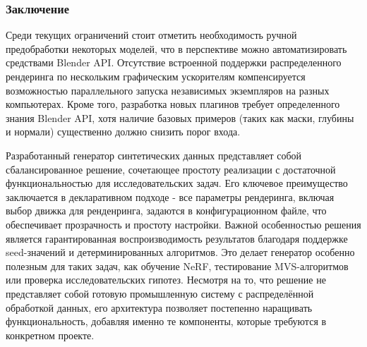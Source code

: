\subsubsection*{Заключение}

Среди текущих ограничений стоит отметить необходимость ручной предобработки
некоторых моделей, что в перспективе можно автоматизировать средствами Blender
API. Отсутствие встроенной поддержки распределенного рендеринга по нескольким
графическим ускорителям компенсируется возможностью параллельного запуска
независимых экземпляров на разных компьютерах. Кроме того, разработка новых
плагинов требует определенного знания Blender API, хотя наличие базовых примеров
(таких как маски, глубины и нормали) существенно должно снизить порог входа.

Разработанный генератор синтетических данных представляет собой сбалансированное
решение, сочетающее простоту реализации с достаточной функциональностью для
исследовательских задач. Его ключевое преимущество заключается в декларативном
подходе - все параметры рендеринга, включая выбор движка для ренденринга,
задаются в конфигурационном файле, что обеспечивает прозрачность и простоту
настройки. Важной особенностью решения является гарантированная воспроизводимость
результатов благодаря поддержке seed-значений и детерминированных алгоритмов.
Это делает генератор особенно полезным для таких задач, как обучение NeRF,
тестирование MVS-алгоритмов или проверка исследовательских гипотез.
Несмотря на то, что решение не представляет собой готовую промышленную систему с
распределённой обработкой данных, его архитектура позволяет постепенно
наращивать функциональность, добавляя именно те компоненты, которые требуются в
конкретном проекте.
